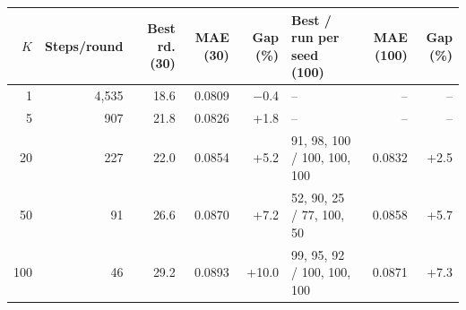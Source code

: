 \begin{tabular}{rrrrrlrr}
\toprule
$K$ & Steps/round & Best rd. (30) & MAE (30) & Gap (\%) & Best / run per seed (100) & MAE (100) & Gap (\%) \\
\midrule
1 & 4,535 & 18.6 & 0.0809 & −0.4 & -- & -- & -- \\
5 & 907 & 21.8 & 0.0826 & +1.8 & -- & -- & -- \\
20 & 227 & 22.0 & 0.0854 & +5.2 & 91, 98, 100 / 100, 100, 100 & 0.0832 & +2.5 \\
50 & 91 & 26.6 & 0.0870 & +7.2 & 52, 90, 25 / 77, 100, 50 & 0.0858 & +5.7 \\
100 & 46 & 29.2 & 0.0893 & +10.0 & 99, 95, 92 / 100, 100, 100 & 0.0871 & +7.3 \\
\bottomrule
\end{tabular}
